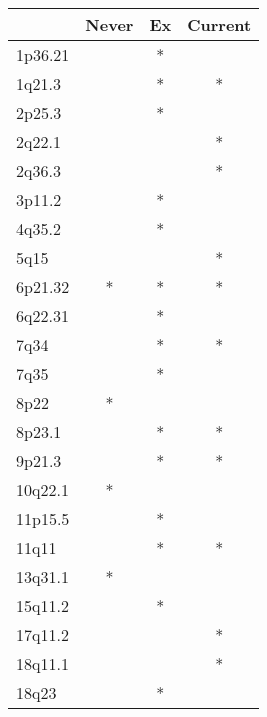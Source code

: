 \begin{tabular}{lccc}
\toprule
{} & Never & Ex & Current \\
\midrule
1p36.21 &       &  * &         \\
1q21.3  &       &  * &       * \\
2p25.3  &       &  * &         \\
2q22.1  &       &    &       * \\
2q36.3  &       &    &       * \\
3p11.2  &       &  * &         \\
4q35.2  &       &  * &         \\
5q15    &       &    &       * \\
6p21.32 &     * &  * &       * \\
6q22.31 &       &  * &         \\
7q34    &       &  * &       * \\
7q35    &       &  * &         \\
8p22    &     * &    &         \\
8p23.1  &       &  * &       * \\
9p21.3  &       &  * &       * \\
10q22.1 &     * &    &         \\
11p15.5 &       &  * &         \\
11q11   &       &  * &       * \\
13q31.1 &     * &    &         \\
15q11.2 &       &  * &         \\
17q11.2 &       &    &       * \\
18q11.1 &       &    &       * \\
18q23   &       &  * &         \\
\bottomrule
\end{tabular}
